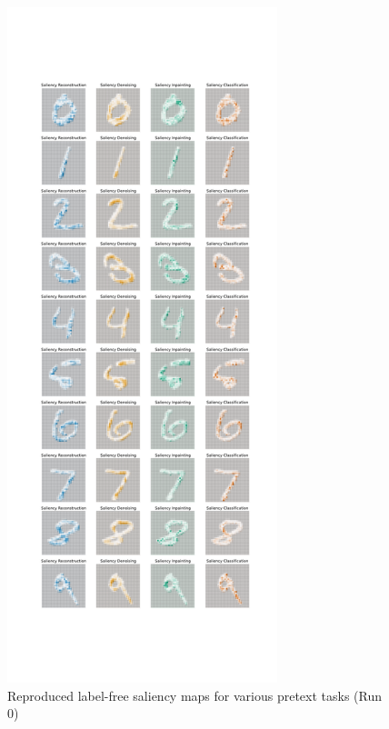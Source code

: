     \begin{figure}
        \centering
        \includegraphics[width=0.7\textwidth]{images/example_imp/saliency_maps_run0.pdf}
        \caption{Reproduced label-free saliency maps for various pretext tasks (Run 0)}
        \label{app:SMs}
    \end{figure}

\newpage

